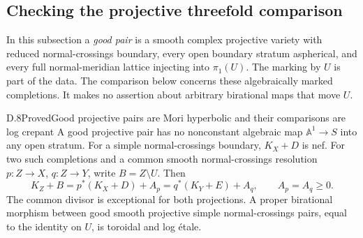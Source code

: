 \subsection{Checking the projective threefold comparison}

In this subsection a \emph{good pair} is a smooth complex projective variety with reduced normal-crossings boundary, every open boundary stratum aspherical, and every full normal-meridian lattice injecting into $\pi_1(U)$. The marking by $U$ is part of the data. The comparison below concerns these algebraically marked completions. It makes no assertion about arbitrary birational maps that move $U$.

\begin{result}{D.8}{Proved}{Good projective pairs are Mori hyperbolic and their comparisons are log crepant}
A good projective pair has no nonconstant algebraic map $\mathbb A^1\to S$ into any open stratum. For a simple normal-crossings boundary, $K_X+D$ is nef. For two such completions and a common smooth normal-crossings resolution $p:Z\to X$, $q:Z\to Y$, write $B=Z\setminus U$. Then
\[
 K_Z+B=p^*(K_X+D)+A_p=q^*(K_Y+E)+A_q,
 \qquad A_p=A_q\geq0.
\]
The common divisor is exceptional for both projections. A proper birational morphism between good smooth projective simple normal-crossings pairs, equal to the identity on $U$, is toroidal and log \'etale.
\end{result}
